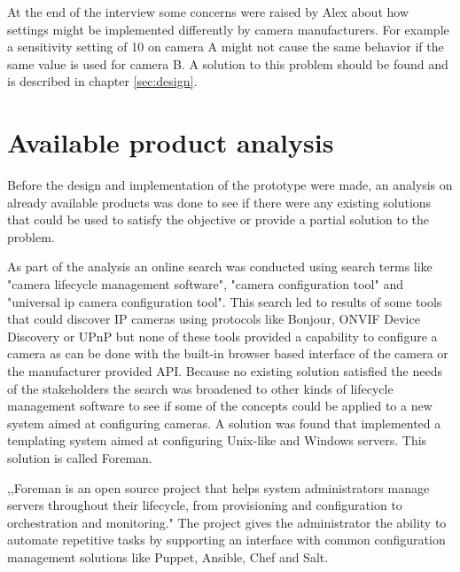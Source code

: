 At the end of the interview some concerns were raised by Alex about how settings might be implemented differently by camera manufacturers. For example a sensitivity setting of 10
on camera A might not cause the same behavior if the same value is used for camera B. A solution to this problem should be found and is described in chapter \ref{sec:design}.


\section{Available product analysis}
Before the design and implementation of the prototype were made, an analysis on already available products was done to see if there were any existing solutions that could be used to satisfy the objective or provide a partial solution to the problem.

As part of the analysis an online search was conducted using search terms like "camera lifecycle management software", "camera configuration tool" and "universal ip camera configuration tool".
This search led to results of some tools that could discover IP cameras using protocols like Bonjour, ONVIF Device Discovery or UPnP but none of these tools provided a capability to configure a camera as can be done with the built-in browser based interface of the camera or the manufacturer provided API.
Because no existing solution satisfied the needs of the stakeholders the search was broadened to other kinds of lifecycle management software to see if some of the concepts could be applied to a new system aimed at configuring cameras. 
A solution was found that implemented a templating system aimed at configuring Unix-like and Windows servers.
This solution is called Foreman.

,,Foreman is an open source project that helps system administrators manage servers throughout their lifecycle, from provisioning and configuration to orchestration and monitoring." \cite{noauthor_foreman_nodate}
The project gives the administrator the ability to automate repetitive tasks by supporting an interface with common configuration management solutions like Puppet, Ansible, Chef and Salt.

